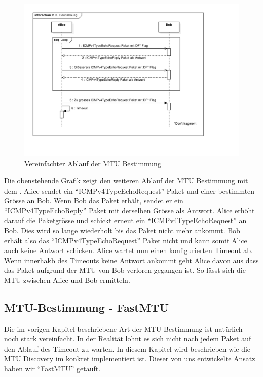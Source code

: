 \begin{figure}[H]
    \begin{center}
        \includegraphics[trim=30 80 140 20,clip,width=\textwidth]{mainpart/implementation/img/MTUBestimmungErfolgreich}
    \end{center}
    \caption{Vereinfachter Ablauf der MTU Bestimmung}
\end{figure}

Die obenstehende Grafik zeigt den weiteren Ablauf der \acs{MTU} Bestimmung mit dem \tool{}. Alice sendet ein \enquote{ICMPv4TypeEchoRequest} Paket und einer bestimmten Grösse an Bob. Wenn Bob das Paket erhält, sendet er ein \enquote{ICMPv4TypeEchoReply} Paket mit derselben Grösse als Antwort. Alice erhöht darauf die Paketgrösse und schickt erneut ein \enquote{ICMPv4TypeEchoRequest} an Bob. Dies wird so lange wiederholt bis das Paket nicht mehr ankommt. Bob erhält also das \enquote{ICMPv4TypeEchoRequest} Paket nicht und kann somit Alice auch keine Antwort schicken. Alice wartet nun einen konfigurierten Timeout ab. Wenn innerhakb des Timeouts keine Antwort ankommt geht Alice davon aus dass das Paket aufgrund der \ac{MTU} von Bob verloren gegangen ist. So lässt sich die \acs{MTU} zwischen Alice und Bob ermitteln.

\subsection{MTU-Bestimmung - FastMTU}
Die im vorigen Kapitel beschriebene Art der \acs{MTU} Bestimmung ist natürlich noch stark vereinfacht. In der Realität lohnt es sich nicht nach jedem Paket auf den Ablauf des Timeout zu warten. In diesem Kapitel wird beschrieben wie die MTU Discovery im \tool konkret implementiert ist. Dieser von uns entwickelte Ansatz haben wir \enquote{FastMTU} getauft.

